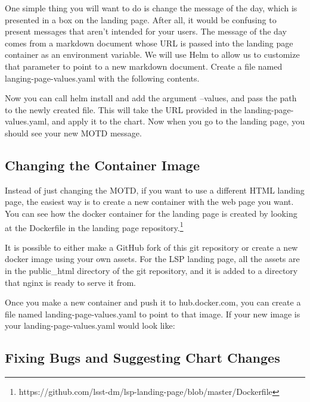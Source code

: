\documentclass[11pt,twoside]{article}
\begin{document}
One simple thing you will want to do is change the message of the day,
which is presented in a box on the landing page.  After all, it would be
confusing to present messages that aren't intended for your users.
The message of the day comes from a markdown document whose URL is passed
into the landing page container as an environment variable.
We will use Helm to allow us to customize that parameter
to point to a new markdown document.  Create a file named langing-page-values.yaml
with the following contents.


Now you can call helm install and add the argument --values, and pass the path to
the newly created file.  This will take the URL provided in the landing-page-values.yaml,
and apply it to the chart.  Now when you go to the landing page, you should see
your new MOTD message.

\subsection{Changing the Container Image}

Instead of just changing the MOTD, if you want to use a different HTML landing page,
the easiest way is to create a new container with the web page you want.  You can
see how the docker container for the landing page is created by looking at the
Dockerfile in the landing page repository.\footnote{https://github.com/lsst-dm/lsp-landing-page/blob/master/Dockerfile}

It is possible to either make a GitHub fork of this git repository or create
a new docker image using your own assets.  For the LSP landing page, all the assets
are in the public\_html directory of the git repository, and it is added to a directory
that nginx is ready to serve it from.

Once you make a new container and push it to hub.docker.com, you can create a
file named landing-page-values.yaml to point to that image.  If your new image is
 your landing-page-values.yaml would look like:


\subsection{Fixing Bugs and Suggesting Chart Changes}
\end{document}
